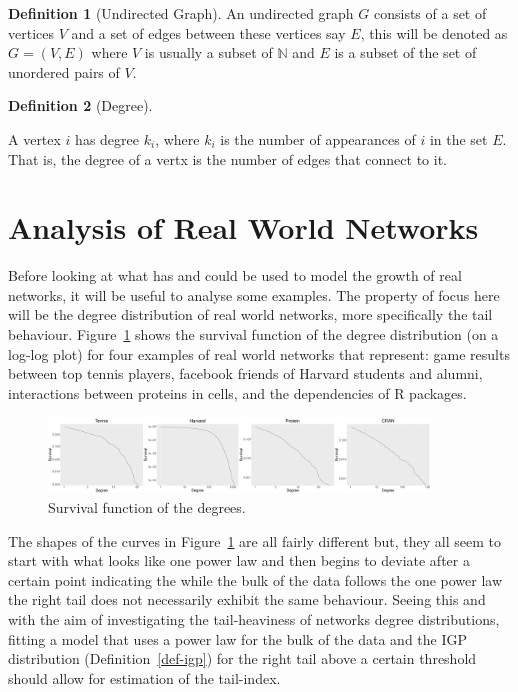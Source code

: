 \documentclass[
  10pt,
  a4paper,
]{scrreprt}
\theoremstyle{definition}
\newtheorem{definition}{Definition}[section]
\theoremstyle{remark}
\begin{document}
{\begin{definition}[Undirected
Graph]
An undirected graph \(G\) consists of a set of vertices \(V\) and a set
of edges between these vertices say \(E\), this will be denoted as
\(G = (V,E)\) where \(V\) is usually a subset of \(\mathbb N\) and \(E\)
is a subset of the set of unordered pairs of \(V\).

\end{definition}

\begin{definition}[Degree]\protect\hypertarget{def-deg}{}\label{def-deg}

A vertex \(i\) has degree \(k_i\), where \(k_i\) is the number of
appearances of \(i\) in the set \(E\). That is, the degree of a vertx is
the number of edges that connect to it.

\end{definition}

\hypertarget{analysis-of-real-world-networks}{%
\section{Analysis of Real World
Networks}\label{analysis-of-real-world-networks}}

Before looking at what has and could be used to model the growth of real
networks, it will be useful to analyse some examples. The property of
focus here will be the degree distribution of real world networks, more
specifically the tail behaviour. Figure~\ref{fig-survs} shows the
survival function of the degree distribution (on a log-log plot) for
four examples of real world networks that represent: game results
between top tennis players, facebook friends of Harvard students and
alumni, interactions between proteins in cells, and the dependencies of
R packages.

\begin{figure}

{\centering \includegraphics[width=0.9\textwidth,height=\textheight]{doc_files/figure-pdf/fig-survs-1.pdf}

}

\caption{\label{fig-survs}Survival function of the degrees.}

\end{figure}

The shapes of the curves in Figure~\ref{fig-survs} are all fairly
different but, they all seem to start with what looks like one power law
and then begins to deviate after a certain point indicating the while
the bulk of the data follows the one power law the right tail does not
necessarily exhibit the same behaviour. Seeing this and with the aim of
investigating the tail-heaviness of networks degree distributions,
fitting a model that uses a power law for the bulk of the data and the
IGP distribution (Definition~\ref{def-igp}) for the right tail above a
certain threshold should allow for estimation of the tail-index.

}
\end{document}

